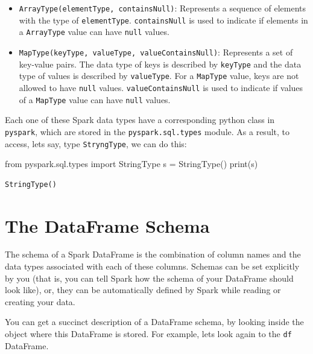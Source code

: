 \documentclass[
  11pt,
  letterpaper,
  DIV=11,
  numbers=noendperiod]{scrreprt}
\newenvironment{Shaded}{\begin{snugshade}}{\end{snugshade}}
\newcommand{\BuiltInTok}[1]{\textcolor[rgb]{0.00,0.23,0.31}{#1}}
\newcommand{\ImportTok}[1]{\textcolor[rgb]{0.00,0.46,0.62}{#1}}
\newcommand{\NormalTok}[1]{\textcolor[rgb]{0.00,0.23,0.31}{#1}}
\newcommand{\OperatorTok}[1]{\textcolor[rgb]{0.37,0.37,0.37}{#1}}
\begin{document}
\begin{itemize}
\item
  \texttt{ArrayType(elementType,\ containsNull)}: Represents a sequence
  of elements with the type of \texttt{elementType}.
  \texttt{containsNull} is used to indicate if elements in a
  \texttt{ArrayType} value can have \texttt{null} values.
\item
  \texttt{MapType(keyType,\ valueType,\ valueContainsNull)}: Represents
  a set of key-value pairs. The data type of keys is described by
  \texttt{keyType} and the data type of values is described by
  \texttt{valueType}. For a \texttt{MapType} value, keys are not allowed
  to have \texttt{null} values. \texttt{valueContainsNull} is used to
  indicate if values of a \texttt{MapType} value can have \texttt{null}
  values.
\end{itemize}

Each one of these Spark data types have a corresponding python class in
\texttt{pyspark}, which are stored in the \texttt{pyspark.sql.types}
module. As a result, to access, lets say, type \texttt{StryngType}, we
can do this:

\begin{Shaded}
\begin{Highlighting}[]
\ImportTok{from}\NormalTok{ pyspark.sql.types }\ImportTok{import}\NormalTok{ StringType}
\NormalTok{s }\OperatorTok{=}\NormalTok{ StringType()}
\BuiltInTok{print}\NormalTok{(s)}
\end{Highlighting}
\end{Shaded}

\begin{verbatim}
StringType()
\end{verbatim}

\hypertarget{sec-dataframe-schema}{%
\section{The DataFrame Schema}\label{sec-dataframe-schema}}

The schema of a Spark DataFrame is the combination of column names and
the data types associated with each of these columns. Schemas can be set
explicitly by you (that is, you can tell Spark how the schema of your
DataFrame should look like), or, they can be automatically defined by
Spark while reading or creating your data.

You can get a succinct description of a DataFrame schema, by looking
inside the object where this DataFrame is stored. For example, lets look
again to the \texttt{df} DataFrame.
\end{document}
